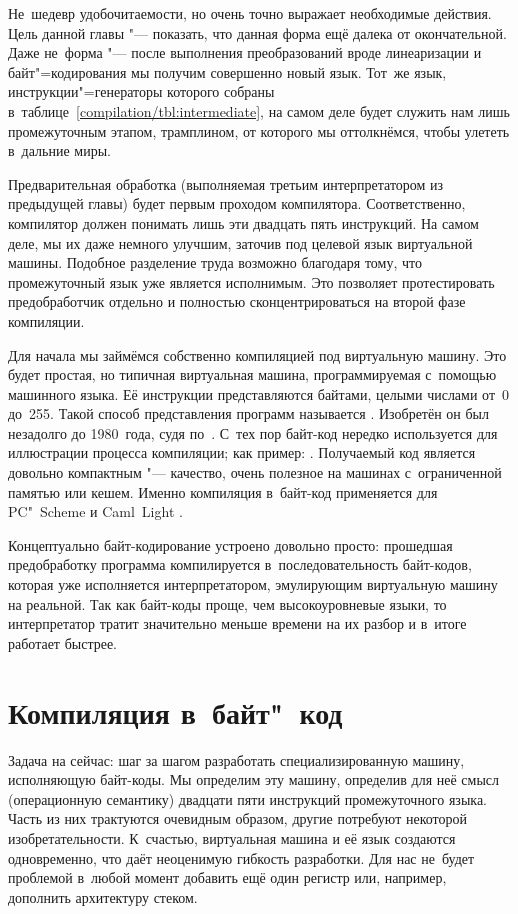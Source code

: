 Не~шедевр удобочитаемости, но очень точно выражает необходимые действия.
Цель данной главы "--- показать, что данная форма ещё далека от окончательной.
Даже не~форма "--- после выполнения преобразований вроде линеаризации и
байт"=кодирования мы получим совершенно новый язык. Тот~же язык,
инструкции"=генераторы которого собраны
в~таблице~\ref{compilation/tbl:intermediate}, на самом деле будет служить
нам лишь промежуточным этапом, трамплином, от которого мы оттолкнёмся,
чтобы улететь в~дальние миры.

Предварительная обработка (выполняемая третьим интерпретатором из предыдущей
главы) будет первым проходом компилятора. Соответственно, компилятор должен
понимать лишь эти двадцать пять инструкций. На самом деле, мы их даже немного
улучшим, заточив под целевой язык виртуальной машины. Подобное разделение труда
возможно благодаря тому, что промежуточный язык уже является исполнимым. Это
позволяет протестировать предобработчик отдельно и полностью сконцентрироваться
на второй фазе компиляции.

Для начала мы займёмся собственно компиляцией под виртуальную машину. Это будет
простая, но типичная виртуальная машина, программируемая с~помощью машинного
языка. Её инструкции представляются байтами, целыми числами от~0 до~255. Такой
способ представления программ называется . Изобретён он был
незадолго до 1980~года, судя по~\cite{deu80,row80}. С~тех пор байт-код нередко
используется для иллюстрации процесса компиляции; как пример: \cite{hen80}.
Получаемый код является довольно компактным "--- качество, очень полезное на
машинах с~ограниченной памятью или кешем. Именно компиляция в~байт-код
применяется для PC"~Scheme \cite{bj86} и Caml~Light \cite{lw93}.

Концептуально байт-кодирование устроено довольно просто: прошедшая предобработку
программа компилируется в~последовательность байт-кодов, которая уже исполняется
интерпретатором, эмулирующим виртуальную машину на реальной. Так как байт-коды
проще, чем высокоуровневые языки, то интерпретатор тратит значительно меньше
времени на их разбор и в~итоге работает быстрее.


\section{Компиляция в~байт"~код}\label{compilation/sect:bytes}

Задача на сейчас: шаг за шагом разработать специализированную машину,
исполняющую байт-коды. Мы определим эту машину, определив для неё смысл
(операционную семантику) двадцати пяти инструкций промежуточного языка.
Часть из них трактуются очевидным образом, другие потребуют некоторой
изобретательности. К~счастью, виртуальная машина и её язык создаются
одновременно, что даёт неоценимую гибкость разработки. Для нас не~будет
проблемой в~любой момент добавить ещё один регистр или, например, дополнить
архитектуру стеком.

